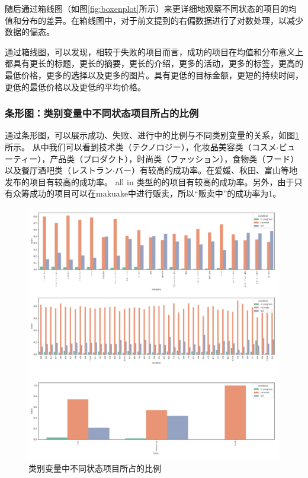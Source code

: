 \documentclass[lang=cn,a4paper]{elegantpaper}
\begin{document}
随后通过箱线图（如图\ref{fig:boxenplot}所示）来更详细地观察不同状态的项目的均值和分布的差异。在箱线图中，对于前文提到的右偏数据进行了对数处理，以减少数据的偏态。

通过箱线图，可以发现，相较于失败的项目而言，成功的项目在均值和分布意义上都具有更长的标题，更长的摘要，更长的介绍，更多的活动，更多的标签，更高的最低价格，更多的选择以及更多的图片。具有更低的目标金额，更短的持续时间，更低的最低价格以及更低的平均价格。



\subsubsection*{条形图：类别变量中不同状态项目所占的比例}
通过条形图，可以展示成功、失败、进行中的比例与不同类别变量的关系，如图\ref{fig:label}所示。
从中我们可以看到技术类（テクノロジー），化妆品美容类（コスメ$\cdot$ビューティー），产品类（プロダクト），时尚类（ファッション），食物类（フード）以及餐厅酒吧类（レストラン$\cdot$バー）有较高的成功率。在爱媛、秋田、富山等地发布的项目有较高的成功率。 all in 类型的的项目有较高的成功率。另外，由于只有众筹成功的项目可以在makuake中进行贩卖，所以“贩卖中”的成功率为1。
\begin{figure}[!htbp]
  \centering
  \includegraphics[width=\linewidth]{image/label.pdf}
  \caption{类别变量中不同状态项目所占的比例}
  \label{fig:label}
\end{figure}
\end{document}

